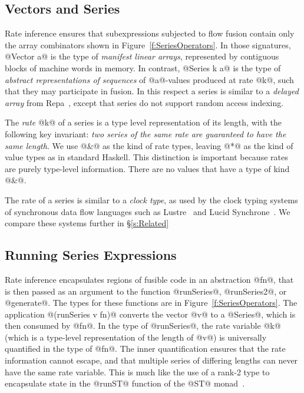 \subsection{Vectors and Series}
\label{s:VectorsAndSeries}

Rate inference ensures that subexpressions subjected to flow fusion contain only the array combinators shown in Figure~\ref{f:SeriesOperators}. In those signatures, @Vector a@ is the type of \emph{manifest linear arrays}, represented by contiguous blocks of machine words in memory. In contrast, @Series k a@ is the type of \emph{abstract representations of sequences} of @a@-values produced at rate @k@, such that they may participate in fusion. In this respect a series is similar to a \emph{delayed array} from Repa~\cite{Keller:Repa}, except that series do not support random access indexing.

The \emph{rate} @k@ of a series is a type level representation of its length, with the following key invariant: \emph{two series of the same rate are guaranteed to have the same length}. We use @&@ as the kind of rate types, leaving @*@ as the kind of value types as in standard Haskell. This distinction is important because rates are purely type-level information. There are no values that have a type of kind @&@.

The rate of a series is similar to a \emph{clock type}, as used by the clock typing systems of synchronous data flow languages such as Lustre~\cite{Caspi:Lustre} and Lucid Synchrone~\cite{Caspi:kahn-networks, Pouzet:lucid-synchrone}. We compare these systems further in \S\ref{s:Related} 


\subsection{Running Series Expressions}

Rate inference encapsulates regions of fusible code in an abstraction @fn@, that is then passed as an argument to the function @runSeries@, @runSeries2@, or @generate@. The types for these functions are in Figure~\ref{f:SeriesOperators}. The application @(runSeries v fn)@ converts the vector @v@ to a @Series@, which is then consumed by @fn@. In the type of @runSeries@, the rate variable @k@ (which is a type-level representation of the length of @v@) is universally quantified in the type of @fn@. The inner quantification ensures that the rate information cannot escape, and that multiple series of differing lengths can never have the same rate variable. This is much like the use of a rank-2 type to encapsulate state in the @runST@ function of the @ST@ monad~\cite{Launchbury:state-threads}.

